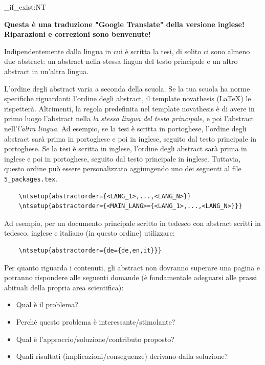 
\ExplSyntaxOn
\cs_if_exist:NT \TitleOnHeader
  { \TitleOnHeader }
\ExplSyntaxOff

%


\textbf{Questa è una traduzione "Google Translate" della versione inglese! Riparazioni e correzioni sono benvenute!}

Indipendentemente dalla lingua in cui è scritta la tesi, di solito ci sono almeno due abstract: un abstract nella stessa lingua del testo principale e un altro abstract in un'altra lingua.

L'ordine degli abstract varia a seconda della scuola. Se la tua scuola ha norme specifiche riguardanti l'ordine degli abstract, il template \gls{novathesis} (\LaTeX) le rispetterà. Altrimenti, la regola predefinita nel template \gls{novathesis} è di avere in primo luogo l'abstract nella \emph{la stessa lingua del testo principale}, e poi l'abstract nell'\emph{l'altra lingua}. Ad esempio, se la tesi è scritta in portoghese, l'ordine degli abstract sarà prima in portoghese e poi in inglese, seguito dal testo principale in portoghese. Se la tesi è scritta in inglese, l'ordine degli abstract sarà prima in inglese e poi in portoghese, seguito dal testo principale in inglese.
%
Tuttavia, questo ordine può essere personalizzato aggiungendo uno dei seguenti al file \verb+5_packages.tex+.

\begin{verbatim}
    \ntsetup{abstractorder={<LANG_1>,...,<LANG_N>}}
    \ntsetup{abstractorder={<MAIN_LANG>={<LANG_1>,...,<LANG_N>}}}
\end{verbatim}

Ad esempio, per un documento principale scritto in tedesco con abstract scritti in tedesco, inglese e italiano (in questo ordine) utilizzare:
\begin{verbatim}
    \ntsetup{abstractorder={de={de,en,it}}}
\end{verbatim}

Per quanto riguarda i contenuti, gli abstract non dovranno superare una pagina e potranno rispondere alle seguenti domande (è fondamentale adeguarsi alle prassi abituali della propria area scientifica):

\begin{itemize}
  \item Qual è il problema?
  \item Perché questo problema è interessante/stimolante?
  \item Qual è l'approccio/soluzione/contributo proposto?
  \item Quali risultati (implicazioni/conseguenze) derivano dalla soluzione?
\end{itemize}

